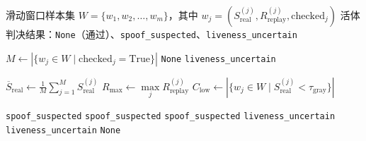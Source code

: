 \documentclass[UTF8]{heuthesis}
\begin{document}
\begin{algorithm}[htbp]
\caption{被动活体窗口融合判决}
\begin{algorithmic}[1]
\Require 滑动窗口样本集 $W = \{w_1, w_2, \ldots, w_m\}$，其中 $w_j = (S_{\mathrm{real}}^{(j)}, R_{\mathrm{replay}}^{(j)}, \text{checked}_j)$
\Ensure 活体判决结果：\texttt{None}（通过）、\texttt{spoof\_suspected}、\texttt{liveness\_uncertain}

\State $M \gets |\{w_j \in W \mid \text{checked}_j = \text{True}\}|$ 
    \State \Return \texttt{None} 
\endIf
{}
    \State \Return \texttt{liveness\_uncertain}
\endIf

\Statex
{}
\State $\overline{S}_{\mathrm{real}} \gets \frac{1}{M} \sum\limits_{j=1}^{M} S_{\mathrm{real}}^{(j)}$
\State $R_{\max} \gets \max\limits_{j} R_{\mathrm{replay}}^{(j)}$
\State $C_{\mathrm{low}} \gets |\{w_j \in W \mid S_{\mathrm{real}}^{(j)} < \tau_{\mathrm{gray}}\}|$ 

\Statex
{}
    \State \Return \texttt{spoof\_suspected}
    \State \Return \texttt{spoof\_suspected}
    \State \Return \texttt{spoof\_suspected}
    \State \Return \texttt{liveness\_uncertain}
    \State \Return \texttt{liveness\_uncertain}
\endIf
\State \Return \texttt{None}
\end{algorithmic}
\label{alg:liveness}
\end{algorithm}
\end{document}
